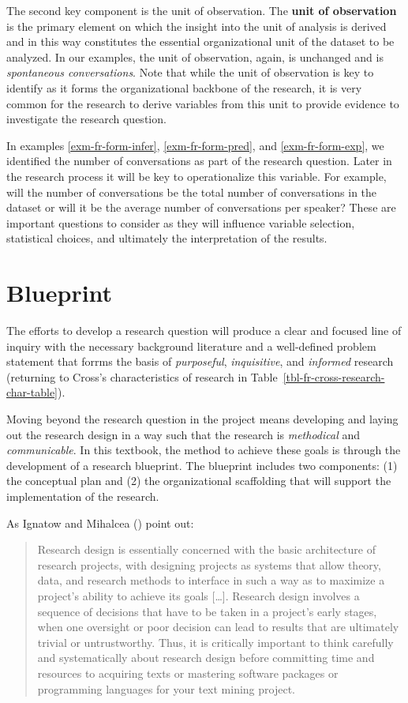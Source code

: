 \documentclass[
  letterpaper,
]{latex/krantz}
\theoremstyle{definition}
\theoremstyle{remark}
\begin{document}
The second key component is the unit of observation. The \textbf{unit of
observation} is the primary element on which the insight into the unit
of analysis is derived and in this way constitutes the essential
organizational unit of the dataset to be analyzed. In our examples, the
unit of observation, again, is unchanged and is \emph{spontaneous
conversations}. Note that while the unit of observation is key to
identify as it forms the organizational backbone of the research, it is
very common for the research to derive variables from this unit to
provide evidence to investigate the research question.

In examples \ref{exm-fr-form-infer}, \ref{exm-fr-form-pred}, and
\ref{exm-fr-form-exp}, we identified the number of conversations as part
of the research question. Later in the research process it will be key
to operationalize this variable. For example, will the number of
conversations be the total number of conversations in the dataset or
will it be the average number of conversations per speaker? These are
important questions to consider as they will influence variable
selection, statistical choices, and ultimately the interpretation of the
results.

\section{Blueprint}\label{sec-fr-blueprint}

The efforts to develop a research question will produce a clear and
focused line of inquiry with the necessary background literature and a
well-defined problem statement that forrms the basis of
\emph{purposeful}, \emph{inquisitive}, and \emph{informed} research
(returning to Cross's characteristics of research in
Table~\ref{tbl-fr-cross-research-char-table}).

Moving beyond the research question in the project means developing and
laying out the research design in a way such that the research is
\emph{methodical} and \emph{communicable}. In this textbook, the method
to achieve these goals is through the development of a research
blueprint. The blueprint includes two components: (1) the conceptual
plan and (2) the organizational scaffolding that will support the
implementation of the research.

As Ignatow and Mihalcea () point out:

\begin{quote}
Research design is essentially concerned with the basic architecture of
research projects, with designing projects as systems that allow theory,
data, and research methods to interface in such a way as to maximize a
project's ability to achieve its goals {[}\ldots{]}. Research design
involves a sequence of decisions that have to be taken in a project's
early stages, when one oversight or poor decision can lead to results
that are ultimately trivial or untrustworthy. Thus, it is critically
important to think carefully and systematically about research design
before committing time and resources to acquiring texts or mastering
software packages or programming languages for your text mining project.
\end{quote}
\end{document}
